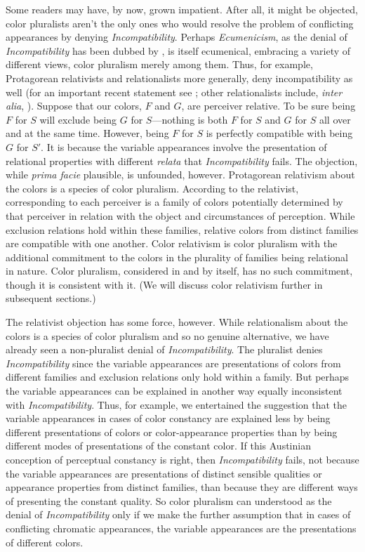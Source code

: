 \documentclass[12pt]{article}
\begin{document}
Some readers may have, by now, grown impatient. After all, it might be objected, color pluralists aren't the only ones who would resolve the problem of conflicting appearances by denying \emph{Incompatibility}. Perhaps \emph{Ecumenicism}, as the denial of \emph{Incompatibility} has been dubbed by \citet{Cohen:2009lq}, is itself ecumenical, embracing a variety of different views, color pluralism merely among them. Thus, for example, Protagorean relativists and relationalists more generally, deny incompatibility as well (for an important recent statement see \citealt{Cohen:2009lq}; other relationalists include, \emph{inter alia}, \citealt{McGinn:1983kl,Thompson:1995fl,Matthen:1999ma,Cohen:2004ox,Matthen:2005md}). Suppose that our colors, \( F \) and \( G \), are perceiver relative. To be sure being \( F \) for \( S \) will exclude being \( G \) for \( S \)---nothing is both \( F \) for \( S \) and \( G \) for \( S \) all over and at the same time. However, being \( F \) for \( S \) is perfectly compatible with being \( G \) for \( S' \). It is because the variable appearances involve the presentation of relational properties with different \emph{relata} that \emph{Incompatibility} fails. The objection, while \emph{prima facie} plausible, is unfounded, however. Protagorean relativism about the colors is a species of color pluralism. According to the relativist, corresponding to each perceiver is a family of colors potentially determined by that perceiver in relation with the object and circumstances of perception. While exclusion relations hold within these families, relative colors from distinct families are compatible with one another. Color relativism is color pluralism with the additional commitment to the colors in the plurality of families being relational in nature. Color pluralism, considered in and by itself, has no such commitment, though it is consistent with it. (We will discuss color relativism further in subsequent sections.)

The relativist objection has some force, however. While relationalism about the colors is a species of color pluralism and so no genuine alternative, we have already seen a non-pluralist denial of \emph{Incompatibility}. The pluralist denies \emph{Incompatibility} since the variable appearances are presentations of colors from different families and exclusion relations only hold within a family. But perhaps the variable appearances can be explained in another way equally inconsistent with \emph{Incompatibility}. Thus, for example, we entertained the suggestion that the variable appearances in cases of color constancy are explained less by being different presentations of colors or color-appearance properties than by being different modes of presentations of the constant color. If this Austinian conception of perceptual constancy is right, then \emph{Incompatibility} fails, not because the variable appearances are presentations of distinct sensible qualities or appearance properties from distinct families, than because they are different ways of presenting the constant quality. So color pluralism can understood as the denial of \emph{Incompatibility} only if we make the further assumption that in cases of conflicting chromatic appearances, the variable appearances are the presentations of different colors. 
\end{document}
